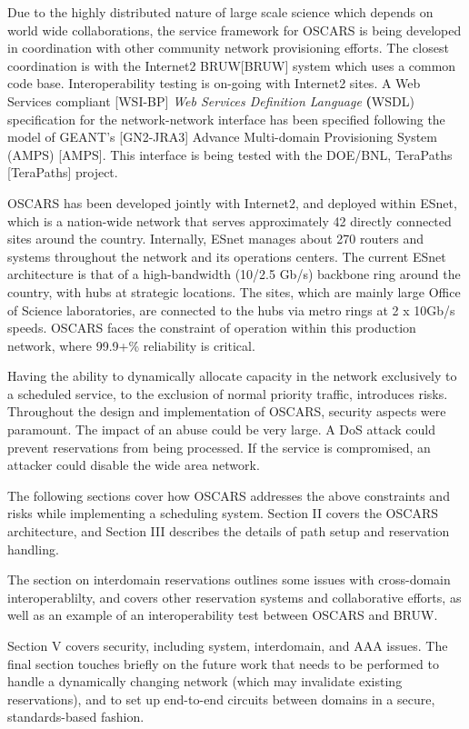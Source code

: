 \documentclass[conference]{IEEEtran}
\begin{document}
Due to the highly distributed nature of large scale science which depends
on world wide collaborations, the service framework for OSCARS is being
developed in  coordination with other community network provisioning efforts. 
The closest coordination is with the Internet2 BRUW[BRUW] system which 
uses a common code base. Interoperability testing is on-going with Internet2 
sites. 
A Web Services compliant [WSI-BP]\emph{ Web Services Definition Language}
 \textbf({WSDL}) specification for the network-network 
interface has been specified following the model of GEANT's [GN2-JRA3] 
Advance Multi-domain Provisioning System (AMPS) [AMPS]. This interface is being 
tested with the DOE/BNL, TeraPaths [TeraPaths] project. 
 
OSCARS has been developed jointly with Internet2, and deployed within ESnet,
which is a nation-wide network that serves approximately 42 directly connected 
sites around the country.  Internally, ESnet manages about 270 routers and 
systems throughout the network and its operations centers.  The current ESnet 
architecture is that of a high-bandwidth (10/2.5 Gb/s) backbone ring 
around the country, with hubs at strategic locations.  The sites, which are 
mainly
large Office of Science laboratories, are connected to the hubs via metro rings at 2 x 10Gb/s speeds.
OSCARS faces the constraint of operation within this production 
network, where 99.9+\% reliability is critical.

Having the ability to dynamically allocate capacity in the network exclusively 
to a scheduled service, to the exclusion of normal priority traffic, introduces 
risks.
Throughout the design and implementation of OSCARS, security aspects were
paramount.  The impact of an abuse could be very
large.  A DoS attack could prevent reservations from being processed.  If the
service is compromised, an attacker could disable the wide area network.

The following sections cover how OSCARS addresses the above constraints and
risks while implementing a scheduling system.  Section II covers the 
OSCARS architecture, and Section III describes the details of
path setup and reservation handling.

The section on interdomain reservations outlines some issues with cross-domain
 interoperablilty, and covers other reservation systems and 
collaborative efforts, as well as 
an example of an interoperability test between OSCARS and BRUW.

Section V covers security, including system, interdomain, and AAA issues.
The final section touches briefly on the future work that needs to be performed
to handle a dynamically changing network (which may invalidate existing
reservations), and to set up end-to-end circuits between domains
in a secure, standards-based fashion.
\end{document}

